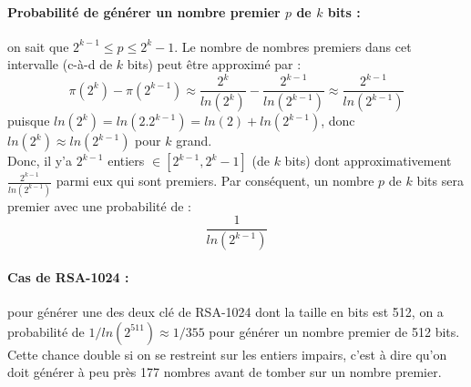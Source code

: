 	\paragraph{Probabilité de générer un nombre premier $p$ de $k$ bits :} on sait que $2^{k-1} \leqslant p \leqslant 2^{k}-1$. Le nombre de nombres premiers dans cet intervalle (c-à-d de $k$ bits) peut être approximé par :
	\[ \pi(2^{k}) - \pi(2^{k-1}) \approx \frac{2^{k}}{ln(2^{k})} - \frac{2^{k-1}}{ln(2^{k-1})} \approx \frac{2^{k-1}}{ln(2^{k-1})}	\]
	puisque $ln(2^{k}) = ln(2.2^{k-1}) = ln(2) + ln(2^{k-1})$, donc $ln(2^{k}) \approx ln(2^{k-1})$ pour $k$ grand.
	\vspace{1em}
	\\
	\noindent Donc, il y'a $2^{k-1}$ entiers $\in [2^{k-1},2^{k}-1]$ (de $k$ bits) dont approximativement $\frac{2^{k-1}}{ln(2^{k-1})}$ parmi eux qui sont premiers. Par conséquent, un nombre $p$ de $k$ bits sera premier avec une probabilité de :
	\[\frac{1}{ln(2^{k-1})}\]
	
	\paragraph{Cas de RSA-1024 :} pour générer une des deux clé de RSA-1024 dont la taille en bits est 512, on a probabilité de $1/ln(2^{511}) \approx 1/355$ pour générer un nombre premier de 512 bits. Cette chance double si on se restreint sur les entiers impairs, c'est à dire qu'on doit générer à peu près 177 nombres avant de tomber sur un nombre premier.